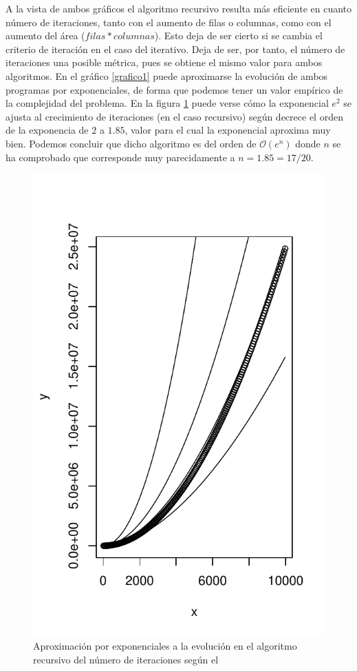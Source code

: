 \documentclass[12pt,a4paper]{article}
\begin{document}
A la vista de ambos gráficos el algoritmo recursivo resulta más eficiente en cuanto número de iteraciones, tanto con el aumento de filas o columnas, como con el aumento del área ($filas*columnas$). Esto deja de ser cierto si se cambia el criterio de iteración en el caso del iterativo. Deja de ser, por tanto, el número de iteraciones una posible métrica, pues se obtiene el mismo valor para ambos algoritmos. En el gráfico \ref{grafico1} puede aproximarse la evolución de ambos programas por exponenciales, de forma que podemos tener un valor empírico de la complejidad del problema.
En la figura \ref{grafico3} puede verse cómo la exponencial $e^{2}$ se ajusta al crecimiento de iteraciones (en el caso recursivo) según decrece el orden de la exponencia de $2$ a $1.85$, valor para el cual la exponencial aproxima muy bien. Podemos concluir que dicho algoritmo es del orden de $\mathcal{O}(e^{n})$ donde $n$ se ha comprobado que corresponde muy parecidamente a $n=1.85=17/20$.

\begin{figure}[h]
	\centering
	\includegraphics[scale=0.9]{fotos/iterations_rec_vs_pows}
	\caption{Aproximación por exponenciales a la evolución en el algoritmo recursivo del número de iteraciones según el }
	\label{grafico3}
\end{figure}
\vspace{0.2cm}
\end{document}
